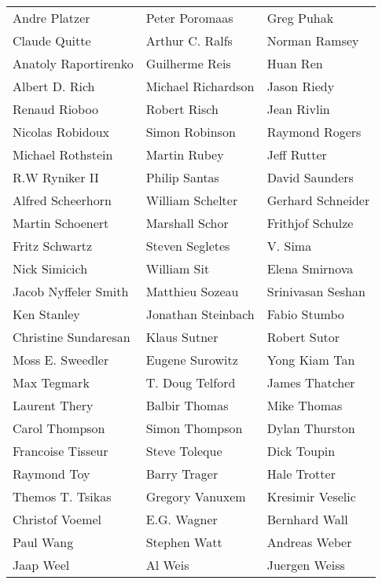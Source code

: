 \begin{tabular}{lll}
Andre Platzer          & Peter Poromaas         & Greg Puhak\\
Claude Quitte          & Arthur C. Ralfs        & Norman Ramsey\\
Anatoly Raportirenko   & Guilherme Reis         & Huan Ren\\
Albert D. Rich         & Michael Richardson     & Jason Riedy\\
Renaud Rioboo          & Robert Risch           & Jean Rivlin\\
Nicolas Robidoux       & Simon Robinson         & Raymond Rogers\\
Michael Rothstein      & Martin Rubey           & Jeff Rutter\\
R.W Ryniker II         & Philip Santas          & David Saunders\\
Alfred Scheerhorn      & William Schelter       & Gerhard Schneider\\
Martin Schoenert       & Marshall Schor         & Frithjof Schulze\\
Fritz Schwartz         & Steven Segletes        & V. Sima\\
Nick Simicich          & William Sit            & Elena Smirnova\\
Jacob Nyffeler Smith   & Matthieu Sozeau        & Srinivasan Seshan\\
Ken Stanley            & Jonathan Steinbach     & Fabio Stumbo\\
Christine Sundaresan   & Klaus Sutner           & Robert Sutor\\
Moss E. Sweedler       & Eugene Surowitz        & Yong Kiam Tan\\
Max Tegmark            & T. Doug Telford        & James Thatcher\\
Laurent Thery          & Balbir Thomas          & Mike Thomas\\
Carol Thompson         & Simon Thompson         & Dylan Thurston\\
Francoise Tisseur      & Steve Toleque          & Dick Toupin\\
Raymond Toy            & Barry Trager           & Hale Trotter\\
Themos T. Tsikas       & Gregory Vanuxem        & Kresimir Veselic\\
Christof Voemel        & E.G. Wagner            & Bernhard Wall\\
Paul Wang              & Stephen Watt           & Andreas Weber\\
Jaap Weel              & Al Weis                & Juergen Weiss\\

\end{tabular}

